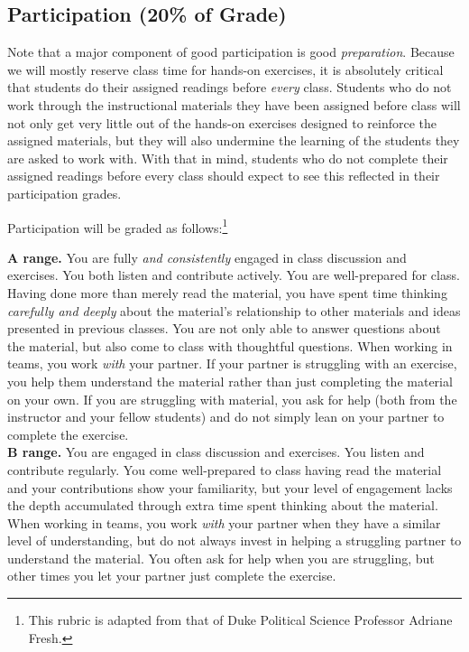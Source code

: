 \documentclass[12pt]{article}
\begin{document}
\subsection{Participation (20\% of Grade)}

Note that a major component of good participation is good \emph{preparation}. Because we will mostly reserve class time for hands-on exercises, it is absolutely critical that students do their assigned readings before \emph{every} class. Students who do not work through the instructional materials they have been assigned before class will not only get very little out of the hands-on exercises designed to reinforce the assigned materials, but they will also undermine the learning of the students they are asked to work with. With that in mind, students who do not complete their assigned readings before every class should expect to see this reflected in their participation grades.

Participation will be graded as follows:\footnote{This rubric is adapted from that of Duke Political Science Professor Adriane Fresh.}

\textbf{A range.}  You are fully \emph{and consistently} engaged in class discussion and exercises.  You both listen and contribute actively.  You are well-prepared for class.  Having done more than merely read the material, you have spent time thinking \emph{carefully and deeply} about the material's relationship to other materials and ideas presented in previous classes. You are not only able to answer questions about the material, but also come to class with thoughtful questions.  When working in teams, you work \emph{with} your partner. If your partner is struggling with an exercise, you help them understand the material rather than just completing the material on your own. If you are struggling with material, you ask for help (both from the instructor and your fellow students) and do not simply lean on your partner to complete the exercise. \\

\textbf{B range.}  You are engaged in class discussion and exercises.  You listen and contribute regularly.  You come well-prepared to class having read the material and your contributions show your familiarity, but your level of engagement lacks the depth accumulated through extra time spent thinking about the material.  When working in teams, you work \emph{with} your partner when they have a similar level of understanding, but do not always invest in helping a struggling partner to understand the material. You often ask for help when you are struggling, but other times you let your partner just complete the exercise. \\
\end{document}
